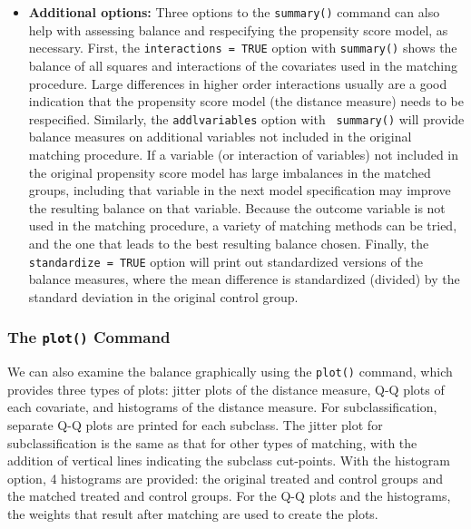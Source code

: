 \begin{itemize}
\item {\bf Additional options:} Three options to the \texttt{summary()}
  command can also help with assessing balance and respecifying the
  propensity score model, as necessary.  First, the {\tt interactions
    = TRUE} option with {\tt summary()} shows the balance of all
  squares and interactions of the covariates used in the matching
  procedure.  Large differences in higher order interactions usually
  are a good indication that the propensity score model (the distance measure) needs to be
  respecified.  Similarly, the {\tt addlvariables} option with {\tt
    summary()} will provide balance measures on additional variables
  not included in the original matching procedure.  If a variable (or
  interaction of variables) not included in the original propensity score model
  has large imbalances in the matched groups, including that
  variable in the next model specification may improve the resulting
  balance on that variable.  Because the outcome variable is not used
  in the matching procedure, a variety of matching methods can be
  tried, and the one that leads to the best resulting balance chosen.  Finally,
  the {\tt standardize = TRUE} option will print out standardized versions of the
  balance measures, where the mean difference is standardized (divided) by the standard deviation
  in the original control group.
\end{itemize}

\subsubsection{The \texttt{plot()} Command}

We can also examine the balance graphically using the \texttt{plot()}
command, which provides three types of plots: jitter plots of the
distance measure, Q-Q plots of each covariate, and histograms of the 
distance measure.  For subclassification, separate Q-Q plots are
printed for each subclass.  The jitter plot for subclassification is
the same as that for other types of matching, with the addition of
vertical lines indicating the subclass cut-points.  With the histogram option,
4 histograms are provided: the original treated and control groups and the matched
treated and control groups.  For the Q-Q plots and the histograms, the weights that result
after matching are used to create the plots.


